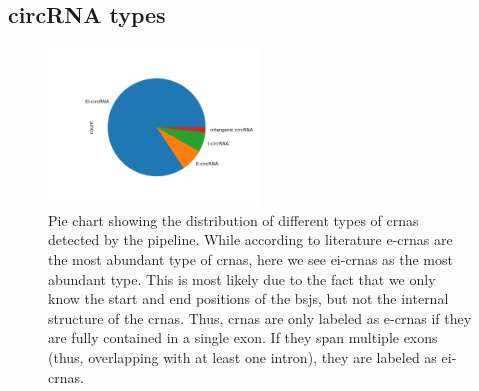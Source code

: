 \subsection{circRNA types}

\begin{figure}[H]
    \centering

    \includegraphics[width=0.5\textwidth]{chapters/4_results_and_discussion/figures/detection/types.png}
    \caption{Pie chart showing the distribution of different types of
        \glspl{crna} detected by the pipeline.
        While according to literature \glspl{e-crna} are the most abundant type of
        \glspl{crna}, here we see \glspl{ei-crna} as the most abundant type.
        This is most likely due to the fact that we only know the start and end
        positions of the \glspl{bsj}, but not the internal structure of the
        \glspl{crna}.
        Thus, \glspl{crna} are only labeled as \glspl{e-crna} if they are fully
        contained in a single exon.
        If they span multiple exons (thus, overlapping with at least one intron), they
        are labeled as \glspl{ei-crna}.
    }
    \label{fig:circrna_types}
\end{figure}

